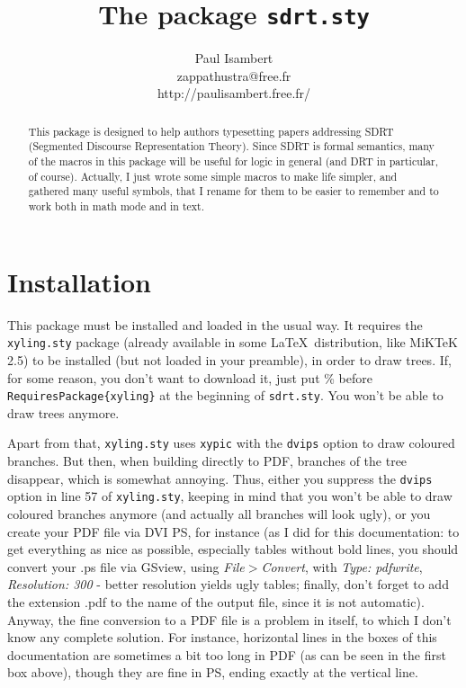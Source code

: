 \documentclass[a4paper]{article}
\begin{document}
\title{\textbf{The package} \texttt{sdrt.sty}}\author{Paul Isambert\\zappathustra@free.fr\\http://paulisambert.free.fr/}

\selectfont
\maketitle
\setcounter{section}{-1}

\begin{abstract}
This package is designed to help authors typesetting papers addressing SDRT (Segmented Discourse Representation Theory). Since SDRT is formal semantics, many of the macros in this package will be useful for logic in general (and DRT in particular, of course). Actually, I just wrote some simple macros to make life simpler, and gathered many useful symbols, that I rename for them to be easier to remember and to work both in math mode and in text.
\end{abstract}

\tableofcontents

\section{Installation}
This package must be installed and loaded in the usual way. It requires the \verb+xyling.sty+ package (already available in some \LaTeX\ distribution, like MiKTeK 2.5) to be installed (but not loaded in your preamble), in order to draw trees. If, for some reason, you don't want to download it, just put \% before \verb+RequiresPackage{xyling}+ at the beginning of \verb+sdrt.sty+. You won't be able to draw trees anymore.

Apart from that, \verb+xyling.sty+ uses \verb+xypic+ with the \verb+dvips+ option to draw coloured branches. But then, when building directly to PDF, branches of the tree disappear, which is somewhat annoying. Thus, either you suppress the \verb+dvips+ option in line 57 of \verb+xyling.sty+, keeping in mind that you won't be able to draw coloured branches anymore (and actually all branches will look ugly), or you create your PDF file via DVI PS, for instance (as I did for this documentation: to get everything as nice as possible, especially tables without bold lines, you should convert your .ps file via GSview, using \emph{File}$>$\emph{Convert}, with \emph{Type: pdfwrite}, \emph{Resolution: 300} - better resolution yields ugly tables; finally, don't forget to add the extension .pdf to the name of the output file, since it is not automatic). Anyway, the fine conversion to a PDF file is a problem in itself, to which I don't know any complete solution. For instance, horizontal lines in the boxes of this documentation are sometimes a bit too long in PDF (as can be seen in the first box above), though they are fine in PS, ending exactly at the vertical line.
\end{document}
